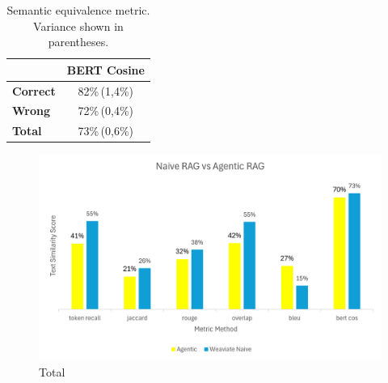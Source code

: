 \begin{table}[h]
\centering
\begin{tabular}{lc}
\hline
 & BERT Cosine \\
\hline
\textbf{Correct} & 82\%\,(1,4\%) \\
\textbf{Wrong}   & 72\%\,(0,4\%) \\
\textbf{Total}   & 73\%\,(0,6\%) \\
\hline
\end{tabular}
\caption{Semantic equivalence metric. Variance shown in parentheses.}
\end{table}

%

\begin{figure}
    \centering
    \includegraphics[width=0.75\linewidth]{Naive Rag vs Agentic Rag.png}
    \caption{Total}
    \label{fig:placeholder}
\end{figure}





